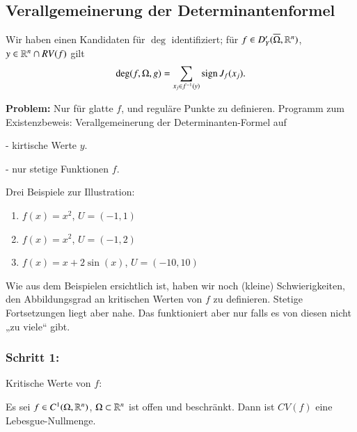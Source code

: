 \subsection{Verallgemeinerung der Determinantenformel}

Wir haben einen Kandidaten für $\deg$ identifiziert; für $f\in D'_Y(\overline\Omega,\mathbb{R}^n)$, $y\in \mathbb{R}^n\cap
RV(f)$ gilt
\[
    \deg(f,\Omega, g)=\sum_{x_j\in f^{-1}(y)} \mathrm{sign}\, J_f(x_j).
\]

\noindent \textbf{Problem:} Nur für glatte $f$, und reguläre Punkte zu definieren. Programm zum 
Existenzbeweis: Verallgemeinerung der Determinanten-Formel auf
\begin{description}
    \item{-} kirtische Werte $y$.
    \item{-} nur stetige Funktionen $f$.
\end{description}

\noindent Drei Beispiele zur Illustration:
\begin{enumerate}
    \item $f(x)=x^2$, $U=(-1,1)$
    \item $f(x)=x^2$, $U=(-1,2)$
    \item $f(x)=x+2\sin(x)$, $U=(-10,10)$
\end{enumerate}
Wie aus dem Beispielen ersichtlich ist, haben wir noch (kleine) Schwierigkeiten, den Abbildungsgrad
an kritischen Werten von $f$ zu definieren. Stetige Fortsetzungen liegt aber nahe. Das funktioniert
aber nur falls es von diesen nicht „zu viele“ gibt.

\subsubsection*{Schritt 1:} Kritische Werte von $f$:

\begin{lem}[Sard]\label{2.5}

Es sei $f\in C^1(\Omega, \mathbb{R}^n)$, $\Omega\subset\mathbb{R}^n$ ist offen und beschränkt. Dann ist
$CV(f)$ eine Lebesgue-Nullmenge.
\end{lem}
    
